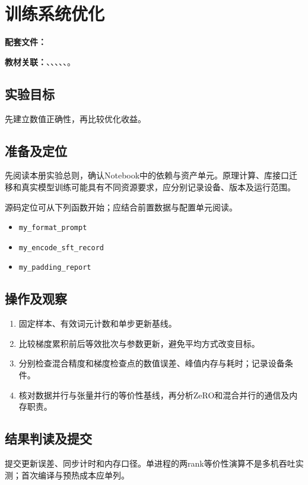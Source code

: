 \chapter{训练系统优化}
\label{lab:A40_training_optimization}

\noindent\textbf{配套文件：}\par
\noindent\textbf{教材关联：}、、、、、。

\section*{实验目标}
先建立数值正确性，再比较优化收益。

\section*{准备及定位}
先阅读本册实验总则，确认Notebook中的依赖与资产单元。原理计算、库接口迁移和真实模型训练可能具有不同资源要求，应分别记录设备、版本及运行范围。

源码定位可从下列函数开始；应结合前置数据与配置单元阅读。
\begin{itemize}
\item \texttt{my\_format\_prompt}
\item \texttt{my\_encode\_sft\_record}
\item \texttt{my\_padding\_report}
\end{itemize}

\section*{操作及观察}
\begin{enumerate}
\item 固定样本、有效词元计数和单步更新基线。
\item 比较梯度累积前后等效批次与参数更新，避免平均方式改变目标。
\item 分别检查混合精度和梯度检查点的数值误差、峰值内存与耗时；记录设备条件。
\item 核对数据并行与张量并行的等价性基线，再分析ZeRO和混合并行的通信及内存职责。
\end{enumerate}

\section*{结果判读及提交}
提交更新误差、同步计时和内存口径。单进程的两rank等价性演算不是多机吞吐实测；首次编译与预热成本应单列。

